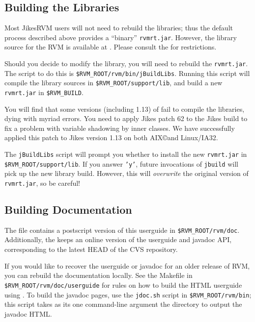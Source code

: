 \JavaTMFooter

\subsection{Building the Libraries}

Most Jikes\trademark RVM users will not need to rebuild the libraries;
thus the default 
process described above provides a ``binary'' {\tt rvmrt.jar}.  However,
the library source for the RVM is available at
\xlink{{\tt \RVMDownloadURL}}{\RVMDownloadURL}.  
Please consult the 
 for restrictions.  

Should you decide to modify the library, you will need to rebuild the 
{\tt rvmrt.jar}.  The script to do this is
{\tt \$RVM\_ROOT/rvm/bin/jBuildLibs}.  Running this script will compile the
library sources in {\tt \$RVM\_ROOT/support/lib}, and build a new {\tt
rvmrt.jar} in {\tt \$RVM\_BUILD}.

You will find that some versions (including 1.13) of 
 fail to compile the
libraries, dying with myriad errors.  You need to apply Jikes 
patch 62 to
the Jikes build to fix a problem with variable shadowing by inner classes. 
We have
successfully applied this patch to Jikes version 1.13 on both
AIX\copyright and Linux/IA32.

The {\tt jBuildLibs} script will prompt you whether to install 
the new {\tt rvmrt.jar} in {\tt \$RVM\_ROOT/support/lib}.  
If you answer {\tt 'y'}, future invocations of {\tt jbuild} will pick up
the new library build.  However, this will
{\em overwrite} the original version of {\tt rvmrt.jar}, so  be
careful!

\JikesAIXTMFooter

\subsection{Building Documentation}

The {\tt \RVMTarFile} file contains a postscript version of this userguide
in {\tt \$RVM\_ROOT/rvm/doc}.  Additionally, the 
 keeps an online version of
the userguide and javadoc API, corresponding to the latest HEAD of the CVS
repository.

If you would like to recover the userguide or javadoc for an older release
of RVM, you can rebuild the documentation locally.  See the Makefile in
{\tt \$RVM\_ROOT/rvm/doc/userguide} for rules on how to build the
HTML userguide using
.  To build the javadoc pages, use
the {\tt jdoc.sh} script in {\tt \$RVM\_ROOT/rvm/bin}; this script takes as
its one command-line argument the directory to output the javadoc HTML.

